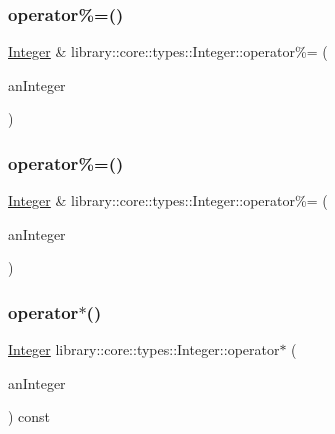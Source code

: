 \subsubsection{\texorpdfstring{operator\%=()}{operator\%=()}\hspace{0.1cm}{\footnotesize\ttfamily [1/2]}}
{\footnotesize\ttfamily \hyperlink{classlibrary_1_1core_1_1types_1_1_integer}{Integer} \& library\+::core\+::types\+::\+Integer\+::operator\%= (\begin{DoxyParamCaption}\item[{const \hyperlink{classlibrary_1_1core_1_1types_1_1_integer}{Integer} \&}]{an\+Integer }\end{DoxyParamCaption})}

\mbox{\label{classlibrary_1_1core_1_1types_1_1_integer_a88482e4677001d7d523f90ef28ac95f6}} 
\subsubsection{\texorpdfstring{operator\%=()}{operator\%=()}\hspace{0.1cm}{\footnotesize\ttfamily [2/2]}}
{\footnotesize\ttfamily \hyperlink{classlibrary_1_1core_1_1types_1_1_integer}{Integer} \& library\+::core\+::types\+::\+Integer\+::operator\%= (\begin{DoxyParamCaption}\item[{const \hyperlink{classlibrary_1_1core_1_1types_1_1_integer_a623afb1580f870fd8a1997b1c12c917d}{Integer\+::\+Value\+Type} \&}]{an\+Integer }\end{DoxyParamCaption})}

\mbox{\label{classlibrary_1_1core_1_1types_1_1_integer_a68d6d1c6e178a5a6760345754eb84ad4}} 
\subsubsection{\texorpdfstring{operator$\ast$()}{operator*()}\hspace{0.1cm}{\footnotesize\ttfamily [1/2]}}
{\footnotesize\ttfamily \hyperlink{classlibrary_1_1core_1_1types_1_1_integer}{Integer} library\+::core\+::types\+::\+Integer\+::operator$\ast$ (\begin{DoxyParamCaption}\item[{const \hyperlink{classlibrary_1_1core_1_1types_1_1_integer}{Integer} \&}]{an\+Integer }\end{DoxyParamCaption}) const}

